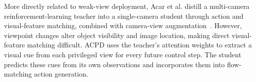 More directly related to weak-view deployment, Acar et al. distill a multi-camera reinforcement-learning teacher into a single-camera student through action and visual-feature matching, combined with camera-view augmentation~\cite{acar2024multicamera}. However, viewpoint changes alter object visibility and image location, making direct visual-feature matching difficult. ACPD uses the teacher's attention weights to extract a visual cue from each privileged view for every future control step. The student predicts these cues from its own observations and incorporates them into flow-matching action generation.

